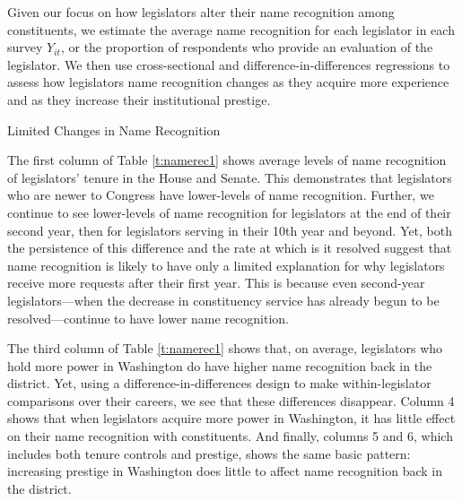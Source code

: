 \documentclass[12pt]{article}
\begin{document}
Given our focus on how legislators alter their name recognition among constituents, we estimate the average name recognition for each legislator in each survey $Y_{it}$, or the proportion of respondents who provide an evaluation of the legislator.  We then use cross-sectional and difference-in-differences regressions to assess how legislators name recognition changes as they acquire more experience and as they increase their institutional prestige.  

\begin{table}[hbt!]
\caption{Limited Changes in Name Recognition} \label{t:namerec1}

\begin{minipage}{\textwidth}
\begin{center}

\end{center}
\end{minipage}
\end{table}


The first column of Table \ref{t:namerec1} shows average levels of name recognition of legislators' tenure in the House and Senate.  This demonstrates that legislators who are newer to Congress have lower-levels of name recognition. Further, we continue to see lower-levels of name recognition for legislators at the end of their second year, then for legislators serving in their 10th year and beyond.  Yet, both the persistence of this difference and the rate at which is it resolved suggest that name recognition is likely to have only a limited explanation for why legislators receive more requests after their first year.  This is because even second-year legislators---when the decrease in constituency service has already begun to be resolved---continue to have lower name recognition.   


The third column of Table \ref{t:namerec1} shows that, on average, legislators who hold more power in Washington do have higher name recognition back in the district.  Yet, using a difference-in-differences design to make within-legislator comparisons over their careers, we see that these differences disappear.  Column 4 shows that when legislators acquire more power in Washington, it has little effect on their name recognition with constituents.  And finally, columns 5 and 6, which includes both tenure controls and prestige, shows the same basic pattern: increasing prestige in Washington does little to affect name recognition back in the district.  
\end{document}
